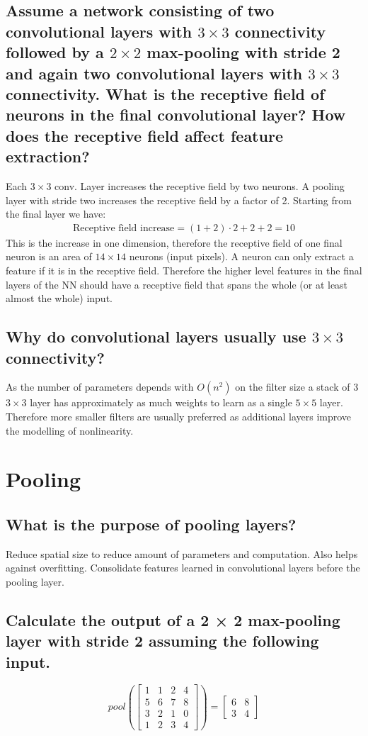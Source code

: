 \subsection{Assume a network consisting of two convolutional layers with $3 \times 3$ connectivity followed by a $2 \times 2$ max-pooling with stride 2 and again two convolutional layers with $3 \times 3$ connectivity. What is the receptive field of neurons in the final convolutional layer? How does the receptive field affect feature extraction? }
Each $3\times 3$ conv. Layer increases the receptive field by two neurons. A pooling layer with stride two increases the receptive field by a factor of 2. Starting from the final layer we have:
\begin{align*}
\text{Receptive field increase} = (1+2) \cdot 2 + 2+ 2 = 10
\end{align*}
This is the increase in one dimension, therefore the receptive field of one final neuron is an area of $14\times 14$ neurons (input pixels).
A neuron can only extract a feature if it is in the receptive field. Therefore the higher level features in the final layers of the NN should have a receptive field that spans the whole (or at least almost the whole) input.
\subsection{Why do convolutional layers usually use $3 \times 3$ connectivity?}
As the number of parameters depends with $O(n^2)$ on the filter size a stack of 3 $3\times 3$ layer has approximately as much weights to learn as a single $5\times 5$ layer. Therefore more smaller filters are usually preferred as additional layers improve the modelling of nonlinearity.
%
\section{Pooling}
\subsection{What is the purpose of pooling layers?}
Reduce spatial size to reduce amount of parameters and computation. Also helps against overfitting. Consolidate features learned in convolutional layers before the pooling layer.
\subsection{Calculate the output of a 2 × 2 max-pooling layer with stride 2 assuming the following input.}
\begin{equation}
pool\left(\begin{bmatrix}
1 & 1 & 2 & 4\\
5&6&7&8\\
3&2&1&0\\
1&2&3&4
\end{bmatrix}\right) = \begin{bmatrix}6 & 8 \\3 & 4\end{bmatrix}
\end{equation}
